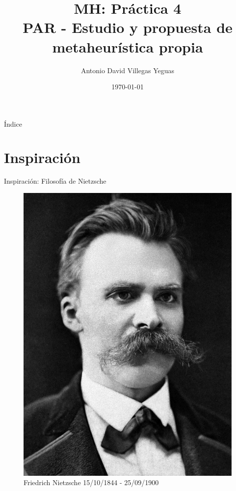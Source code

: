\documentclass{beamer}
\title{MH: Práctica 4\\
			PAR - Estudio y propuesta de metaheurística propia}
\date{\today}
\author{Antonio David Villegas Yeguas}
\institute{Universidad de Granada\\
\medskip
\textit{advy99@correo.ugr.es}
}
\begin{document}
 \maketitle

\begin{frame}{Índice}
\tableofcontents
\end{frame}
  
  
\section{Inspiración}
\begin{frame}{Inspiración: Filosofía de Nietzsche}

	\begin{minipage}{0.3\textwidth}
    	\begin{figure}
   		 	\includegraphics[scale=0.26]{nietzsche.jpg}
    		\caption{\footnotesize{Friedrich Nietzsche 15/10/1844 - 25/09/1900}}
   	

\end{figure}
\end{minipage}
\end{frame}
\end{document}
